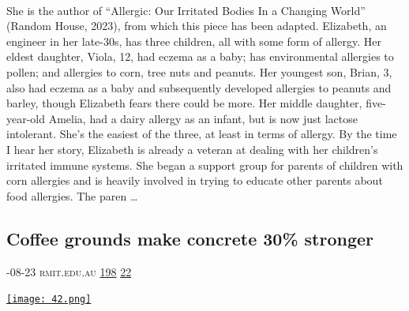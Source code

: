 \documentclass[10pt,a4paper]{article}
\begin{document}
\begin{multicols}{2}
\paragraph{}
 She is the author of “Allergic: Our Irritated Bodies In a Changing World” (Random House, 2023), from which this piece has been adapted.
Elizabeth, an engineer in her late-30s, has three children, all with some form of allergy. Her eldest daughter, Viola, 12, had eczema as a baby; has environmental allergies to pollen; and allergies to corn, tree nuts and peanuts.
Her youngest son, Brian, 3, also had eczema as a baby and subsequently developed allergies to peanuts and barley, though Elizabeth fears there could be more. Her middle daughter, five-year-old Amelia, had a dairy allergy as an infant, but is now just lactose intolerant. She’s the easiest of the three, at least in terms of allergy.
By the time I hear her story, Elizabeth is already a veteran at dealing with her children’s irritated immune systems. She began a support group for parents of children with corn allergies and is heavily involved in trying to educate other parents about food allergies.
The paren
\dots\par
\noindent\begin{minipage}{\linewidth}
\medskip
\subsection{Coffee grounds make concrete 30\% stronger}
\textsc{\footnotesize
{\scriptsize\faCalendar}-08-23 
{\scriptsize\faGlobe}\space 
rmit.edu.au 
{\scriptsize\faThumbsOUp}\space 
\href{http://news.ycombinator.com/item?id=37234404\&utm\_term=comment}{198} 
{\scriptsize\faComments}\space 
\href{http://news.ycombinator.com/item?id=37234404\&utm\_term=comment}{22} 
}
\par\medskip\noindent
\href{https://www.rmit.edu.au/news/all-news/2023/aug/coffee-concrete?utm\_source=hackernewsletter\&utm\_medium=email\&utm\_term=learn}{
    \texttt{[image: 42.png]}
}
\end{minipage}

\end{multicols}
\end{document}
